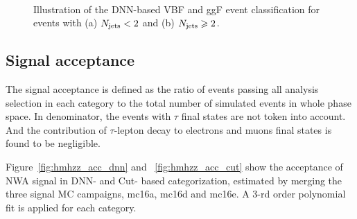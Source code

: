 \begin{figure}[h]
\centering
{}
\\
\caption{Illustration of the DNN-based VBF and ggF event classification for events with (a) $N_{\mathrm{jets}}  < 2$ and (b) $N_{\mathrm{jets}}  \geqslant 2$.}
\label{fig:hmhzz_dnncate}
\end{figure}

\subsection{Signal acceptance} 
\label{sec:hmhzz_signal_acc}
The signal acceptance is defined as the ratio of events passing all analysis selection in each category to the total number of simulated events in whole phase space.
In denominator, the events with $\tau$ final states are not token into account.
And the contribution of $\tau$-lepton decay to electrons and muons final states is found to be negligible.

Figure~\ref{fig:hmhzz_acc_dnn} and ~\ref{fig:hmhzz_acc_cut} show the acceptance of NWA signal in DNN- and Cut- based categorization, estimated by merging the three signal MC campaigns, mc16a, mc16d and mc16e.
A 3-rd order polynomial fit is applied for each category.

